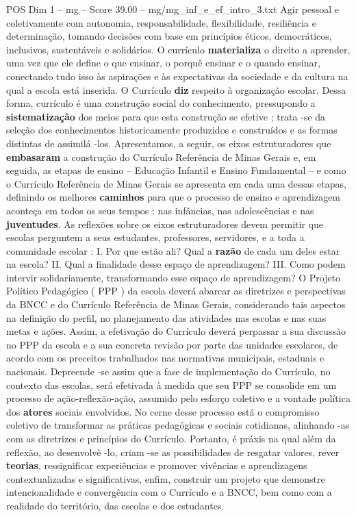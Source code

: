 \begin{textsample}{POS Dim 1 – mg – Score 39.00 – mg/mg\_inf\_e\_ef\_intro\_3.txt}
Agir pessoal e coletivamente com autonomia, responsabilidade, flexibilidade, resiliência e determinação, tomando decisões com base em princípios éticos, democráticos, inclusivos, sustentáveis e solidários.
O currículo \textbf{materializa} o direito a aprender, uma vez que ele define o que ensinar, o porquê ensinar e o quando ensinar, conectando tudo isso às aspirações e às expectativas da sociedade e da cultura na qual a escola está inserida.
O Currículo \textbf{diz} respeito à organização escolar.
Dessa forma, currículo é uma construção social do conhecimento, pressupondo a \textbf{sistematização} dos meios para que esta construção se efetive ; trata -se da seleção dos conhecimentos historicamente produzidos e construídos e as formas distintas de assimilá -los.
Apresentamos, a seguir, os eixos estruturadores que \textbf{embasaram} a construção do Currículo Referência de Minas Gerais e, em seguida, as etapas de ensino – Educação Infantil e Ensino Fundamental – e como o Currículo Referência de Minas Gerais se apresenta em cada uma dessas etapas, definindo os melhores \textbf{caminhos} para que o processo de ensino e aprendizagem aconteça em todos os seus tempos : nas infâncias, nas adolescências e nas \textbf{juventudes}.
As reflexões sobre os eixos estruturadores devem permitir que escolas perguntem a seus estudantes, professores, servidores, e a toda a comunidade escolar : I.
Por que estão ali?
Qual a \textbf{razão} de cada um deles estar na escola?
II.
Qual a finalidade desse espaço de aprendizagem?
III.
Como podem intervir solidariamente, transformando esse espaço de aprendizagem?
O Projeto Político Pedagógico ( PPP ) da escola deverá abarcar as diretrizes e perspectivas da BNCC e do Currículo Referência de Minas Gerais, considerando tais aspectos na definição do perfil, no planejamento das atividades nas escolas e nas suas metas e ações.
Assim, a efetivação do Currículo deverá perpassar a sua discussão no PPP da escola e a sua concreta revisão por parte das unidades escolares, de acordo com os preceitos trabalhados nas normativas municipais, estaduais e nacionais.
Depreende -se assim que a fase de implementação do Currículo, no contexto das escolas, será efetivada à medida que seu PPP se consolide em um processo de ação-reflexão-ação, assumido pelo esforço coletivo e a vontade política dos \textbf{atores} sociais envolvidos.
No cerne desse processo está o compromisso coletivo de transformar as práticas pedagógicas e sociais cotidianas, alinhando -as com as diretrizes e princípios do Currículo.
Portanto, é práxis na qual além da reflexão, ao desenvolvê -lo, criam -se as possibilidades de resgatar valores, rever \textbf{teorias}, ressignificar experiências e promover vivências e aprendizagens contextualizadas e significativas, enfim, construir um projeto que demonstre intencionalidade e convergência com o Currículo e a BNCC, bem como com a realidade do território, das escolas e dos estudantes.

\end{textsample}
